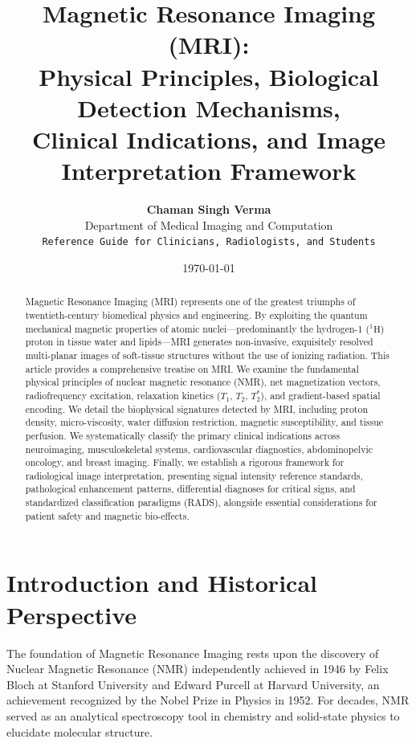 \documentclass[11pt,a4paper]{article}
\title{\textbf{\huge Magnetic Resonance Imaging (MRI):}\\[0.3em]
\Large Physical Principles, Biological Detection Mechanisms,\\
Clinical Indications, and Image Interpretation Framework}
\author{\textbf{Chaman Singh Verma}\\[0.2em]
\small Department of Medical Imaging and Computation\\
\small \texttt{Reference Guide for Clinicians, Radiologists, and Students}}
\date{\today}
\begin{document}
\maketitle

\begin{abstract}
Magnetic Resonance Imaging (MRI) represents one of the greatest triumphs of twentieth-century biomedical physics and engineering. By exploiting the quantum mechanical magnetic properties of atomic nuclei—predominantly the hydrogen-1 ($^1\text{H}$) proton in tissue water and lipids—MRI generates non-invasive, exquisitely resolved multi-planar images of soft-tissue structures without the use of ionizing radiation. This article provides a comprehensive treatise on MRI. We examine the fundamental physical principles of nuclear magnetic resonance (NMR), net magnetization vectors, radiofrequency excitation, relaxation kinetics ($T_1$, $T_2$, $T_2^*$), and gradient-based spatial encoding. We detail the biophysical signatures detected by MRI, including proton density, micro-viscosity, water diffusion restriction, magnetic susceptibility, and tissue perfusion. We systematically classify the primary clinical indications across neuroimaging, musculoskeletal systems, cardiovascular diagnostics, abdominopelvic oncology, and breast imaging. Finally, we establish a rigorous framework for radiological image interpretation, presenting signal intensity reference standards, pathological enhancement patterns, differential diagnoses for critical signs, and standardized classification paradigms (RADS), alongside essential considerations for patient safety and magnetic bio-effects.
\end{abstract}

\tableofcontents
\newpage

\section{Introduction and Historical Perspective}

The foundation of Magnetic Resonance Imaging rests upon the discovery of Nuclear Magnetic Resonance (NMR) independently achieved in 1946 by Felix Bloch at Stanford University and Edward Purcell at Harvard University, an achievement recognized by the Nobel Prize in Physics in 1952. For decades, NMR served as an analytical spectroscopy tool in chemistry and solid-state physics to elucidate molecular structure.
\end{document}
